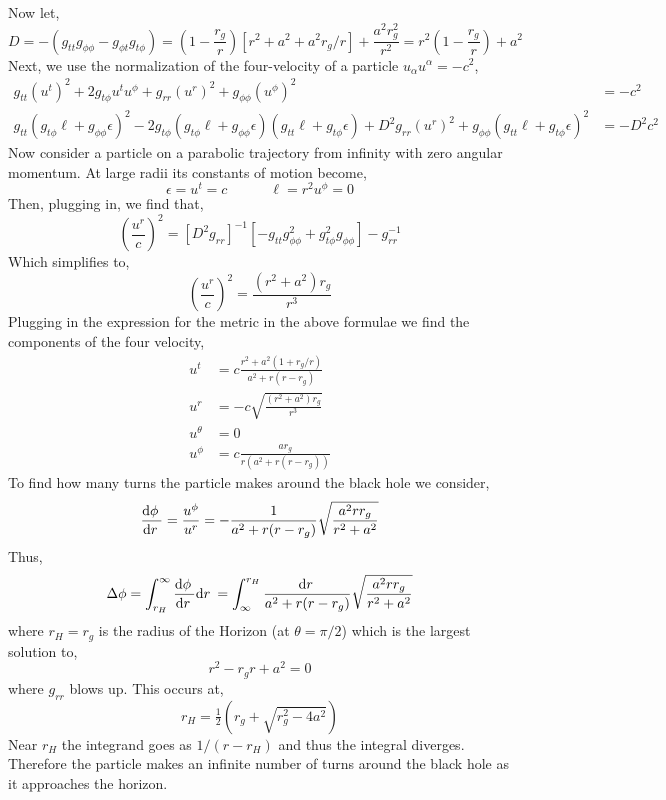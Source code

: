 \documentclass[12pt]{article}
\begin{document}
Now let,
\[ D =  - \left( g_{tt} g_{\phi \phi} - g_{\phi t} g_{t \phi} \right) =  \left( 1 - \frac{r_g}{r} \right) [r^2 + a^2 + a^2 r_g / r ] + \frac{a^2 r_g^2}{r^2} = r^2 \left( 1 - \frac{r_g}{r} \right) + a^2 \]
Next, we use the normalization of the four-velocity of a particle $u_\alpha u^\alpha = - c^2$,
\begin{align*}
g_{tt} (u^t)^2 + 2 g_{t \phi} u^t u^\phi + g_{rr} (u^r)^2 + g_{\phi \phi} (u^\phi)^2 & = - c^2 
\\
g_{tt} (g_{t \phi} \ell + g_{\phi \phi} \epsilon)^2 - 2 g_{t \phi} (g_{t \phi} \ell + g_{\phi \phi} \epsilon)(g_{tt} \ell + g_{t \phi} \epsilon) + D^2 g_{rr} (u^r)^2 + g_{\phi \phi} (g_{tt} \ell + g_{t \phi} \epsilon )^2 & = - D^2 c^2
\end{align*}
Now consider a particle on a parabolic trajectory from infinity with zero angular momentum. At large radii its constants of motion become,
\[ \epsilon = u^t = c \quad \quad \quad \ell = r^2 u^\phi = 0 \]
Then, plugging in, we find that,
\[ \left( \frac{u^r}{c} \right)^2 = [D^2 g_{rr} ]^{-1} \left[ - g_{tt} g_{\phi \phi}^2 + g_{t \phi}^2 g_{\phi \phi} \right] - g_{rr}^{-1} \]
Which simplifies to,
\[ \left( \frac{u^r}{c} \right)^2 = \frac{(r^2 + a^2) r_g}{r^3} \] 
Plugging in the expression for the metric in the above formulae we find the components of the four velocity,
\begin{align*}
u^t & = c \frac{r^2 + a^2(1 + r_g / r)}{a^2 + r(r - r_g)}
\\
u^r & = -c \sqrt{ \frac{(r^2 + a^2)r_g}{r^3}}
\\
u^\theta & = 0
\\
u^\phi & = c \frac{a r_g}{r (a^2 + r(r - r_g))}
\end{align*}
To find how many turns the particle makes around the black hole we consider,
\begin{align*}
\frac{\mathrm{d}\phi \:}{\mathrm{d}r \:} = \frac{u^\phi}{u^r} = - \frac{1}{a^2 + r(r - r_g)} \sqrt{\frac{a^2 r r_g}{r^2 + a^2}} 
\end{align*}
Thus,
\[ \Delta \phi = \int_{r_H}^\infty \frac{\mathrm{d}\phi \:}{\mathrm{d}r \:} \mathrm{d}r \: =  \int_{\infty}^{r_H} \frac{\mathrm{d}r \:}{a^2 + r(r - r_g)} \sqrt{\frac{a^2 r r_g}{r^2 + a^2}}  \]
where $r_H = r_g$ is the radius of the Horizon (at $\theta = \pi / 2$) which is the largest solution to,
\[ r^2 - r_g r + a^2 = 0 \]
where $g_{rr}$ blows up. This occurs at,
\[ r_H = \tfrac{1}{2} (r_g + \sqrt{r_g^2 - 4 a^2}) \]
Near $r_H$ the integrand goes as $1/(r - r_H)$ and thus the integral diverges. Therefore the particle makes an infinite number of turns around the black hole as it approaches the horizon. 
\end{document}
